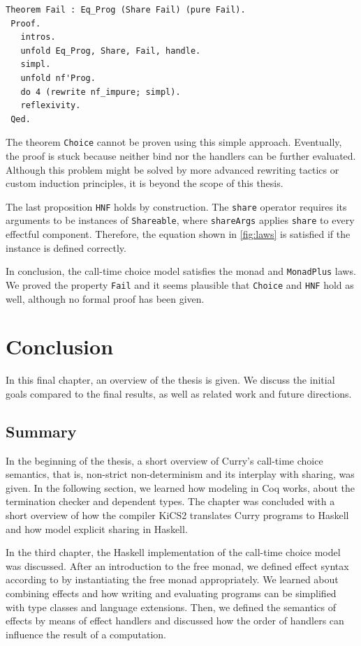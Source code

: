 \documentclass[a4paper, 11pt, fleqn, twoside, abstract=on]{scrreprt}
\newcommand{\hinl}[1]{\texttt{#1}}
\newcommand{\cinl}[1]{\texttt{#1}}
\begin{document}
\begin{verbatim}
Theorem Fail : Eq_Prog (Share Fail) (pure Fail).
 Proof.
   intros.
   unfold Eq_Prog, Share, Fail, handle.
   simpl.
   unfold nf'Prog.
   do 4 (rewrite nf_impure; simpl).
   reflexivity.
 Qed.
\end{verbatim}

The theorem \cinl{Choice} cannot be proven using this simple approach.
Eventually, the proof is stuck because neither bind nor the handlers can be further evaluated.
Although this problem might be solved by more advanced rewriting tactics or custom induction principles, it is beyond the scope of this thesis.

The last proposition \cinl{HNF} holds by construction.
The \cinl{share} operator requires its arguments to be instances of \cinl{Shareable}, where \cinl{shareArgs} applies \cinl{share} to every effectful component.
Therefore, the equation shown in \autoref{fig:laws} is satisfied if the instance is defined correctly.

In conclusion, the call-time choice model satisfies the monad and \hinl{MonadPlus} laws.
We proved the property \cinl{Fail} and it seems plausible that \cinl{Choice} and \cinl{HNF} hold as well, although no formal proof has been given.

\chapter{Conclusion}
\label{ch:conclusion}

In this final chapter, an overview of the thesis is given.
We discuss the initial goals compared to the final results, as well as related work and future directions.

\section{Summary}

In the beginning of the thesis, a short overview of Curry's call-time choice semantics, that is, non-strict non-determinism and its interplay with sharing, was given.
In the following section, we learned how modeling in Coq works, about the termination checker and dependent types.
The chapter was concluded with a short overview of how the compiler KiCS2 translates Curry programs to Haskell and how \citet{fischer2009purely} model explicit sharing in Haskell.

In the third chapter, the Haskell implementation of the call-time choice model was discussed.
After an introduction to the free monad, we defined effect syntax according to \citet{wu2014effect} by instantiating the free monad appropriately.
We learned about combining effects and how writing and evaluating programs can be simplified with type classes and language extensions.
Then, we defined the semantics of effects by means of effect handlers and discussed how the order of handlers can influence the result of a computation.
\end{document}
